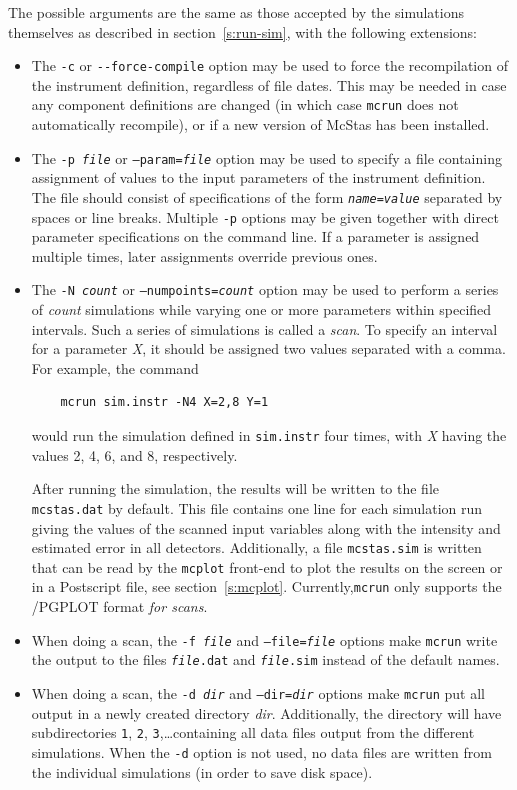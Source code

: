 The possible arguments are the same as those accepted by the simulations
themselves as described in section~\ref{s:run-sim}, with the following
extensions:
\begin{itemize}
\item The \verb+-c+ or \verb+--force-compile+ option may be used to force
  the recompilation of the instrument definition, regardless of file
  dates. This may be needed in case any component definitions are
  changed (in which case \verb+mcrun+ does not automatically recompile),
  or if a new version of McStas has been installed.
\item The \texttt{-p {\it file}} or \texttt{--param={\it file}} option
  may be used to specify a file containing assignment of values to the
  input parameters of the instrument definition. The file should consist
  of specifications of the form \texttt{{\it name\/}={\it value\/}}
  separated by spaces or line breaks. Multiple \verb+-p+ options may be
  given together with direct parameter specifications on the command
  line. If a parameter is assigned multiple times, later assignments
  override previous ones.
\item The \texttt{-N {\it count}} or \texttt{--numpoints={\it count}} option
  may be used to perform a series of \textit{count\/} simulations while
  varying one or more parameters within specified intervals. Such a
  series of simulations is called a \emph{scan}. To specify
  an interval for a parameter \textit{X}, it should be assigned two
  values separated with a comma. For example, the command
\begin{verbatim}
    mcrun sim.instr -N4 X=2,8 Y=1
\end{verbatim}
would run the simulation defined in \verb+sim.instr+ four times, with
\textit{X} having the values 2, 4, 6, and 8, respectively.

After running the simulation, the results will be written to the file
\verb+mcstas.dat+ by default. This file contains one line for each
simulation run giving the values of the scanned input variables along
with the intensity and estimated error in all detectors. Additionally, a
file \verb+mcstas.sim+ is written that can be read by the \verb+mcplot+
front-end to plot the results on the screen or in a Postscript file, see
section~\ref{s:mcplot}. 
Currently,\verb+mcrun+ only supports the \MCS /PGPLOT format \emph{for scans}.
\item When doing a scan, the \texttt{-f {\it file}} and
  \texttt{--file={\it file}} options make \verb+mcrun+ write the output
  to the files \texttt{{\it file\/}.dat} and \texttt{{\it file\/}.sim}
  instead of the default names.
\item When doing a scan, the \texttt{-d {\it dir}} and
  \texttt{--dir={\it dir}} options make \verb+mcrun+ put all output in a
  newly created directory \textit{dir}. Additionally, the directory will
  have subdirectories \verb+1+, \verb+2+, \verb+3+,\ldots containing all
  data files output from the different simulations. When the \verb+-d+
  option is not used, no data files are written from the individual
  simulations (in order to save disk space).
\end{itemize}

